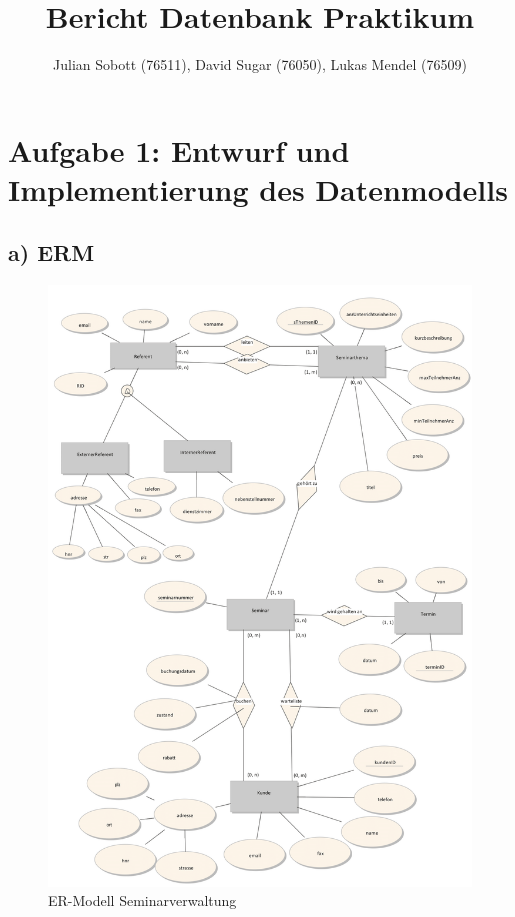 \documentclass[10pt,a4paper]{report}
\author{Julian Sobott (76511), David Sugar (76050), Lukas Mendel (76509)}
\title{Bericht Datenbank Praktikum}
\begin{document}
\maketitle
\tableofcontents

\newpage
\section{Aufgabe 1: Entwurf und Implementierung des Datenmodells}
\subsection{a) ERM}

\begin{figure}[ht!]
	\includegraphics[scale=0.2]{Bilder/ER-Modell.PNG}
	\caption{ER-Modell Seminarverwaltung}
	\label{er:1}
\end{figure}
\end{document}

